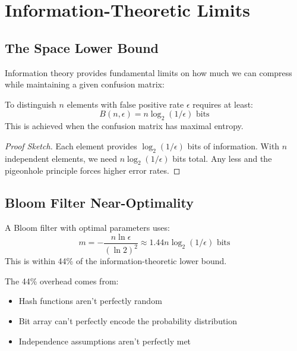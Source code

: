 \section{Information-Theoretic Limits}

\subsection{The Space Lower Bound}

Information theory provides fundamental limits on how much we can compress while maintaining a given confusion matrix:

\begin{theorem}
To distinguish $n$ elements with false positive rate $\epsilon$ requires at least:
\begin{equation}
B(n, \epsilon) = n \log_2(1/\epsilon) \text{ bits}
\end{equation}
This is achieved when the confusion matrix has maximal entropy.
\end{theorem}

\begin{proof}[Proof Sketch]
Each element provides $\log_2(1/\epsilon)$ bits of information. With $n$ independent elements, we need $n \log_2(1/\epsilon)$ bits total. Any less and the pigeonhole principle forces higher error rates.
\end{proof}

\subsection{Bloom Filter Near-Optimality}

\begin{theorem}
A Bloom filter with optimal parameters uses:
\begin{equation}
m = -\frac{n \ln \epsilon}{(\ln 2)^2} \approx 1.44 n \log_2(1/\epsilon) \text{ bits}
\end{equation}
This is within 44\% of the information-theoretic lower bound.
\end{theorem}

The 44\% overhead comes from:
\begin{itemize}
\item Hash functions aren't perfectly random
\item Bit array can't perfectly encode the probability distribution
\item Independence assumptions aren't perfectly met
\end{itemize}

